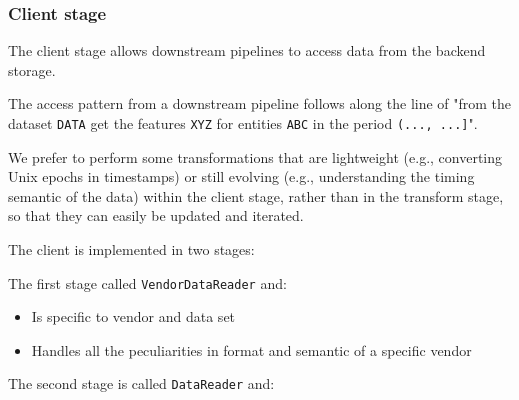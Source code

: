 \documentclass[11pt, reqno]{amsart}
\theoremstyle{definition}
\theoremstyle{remark}
\begin{document}
  \subsubsection{Client stage}

  The client stage allows downstream pipelines to access data from the backend
  storage.

  The access pattern from a downstream pipeline follows along the line of "from the
  dataset \verb|DATA| get the features \verb|XYZ| for entities \verb|ABC| in the
  period \verb|(..., ...]|".

  We prefer to perform some transformations that are lightweight (e.g., converting
  Unix epochs in timestamps) or still evolving (e.g., understanding the timing semantic
  of the data) within the client stage, rather than in the transform stage, so
  that they can easily be updated and iterated.

  The client is implemented in two stages:

  The first stage called \verb|VendorDataReader| and:
  \begin{itemize}
    \item Is specific to vendor and data set

    \item Handles all the peculiarities in format and semantic of a specific vendor
  \end{itemize}

  The second stage is called \verb|DataReader| and:
\end{document}
